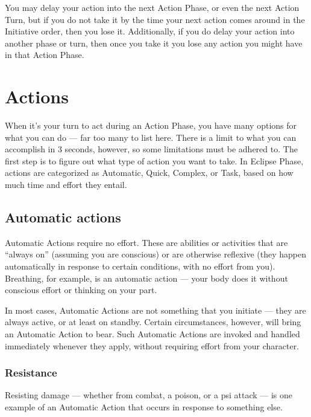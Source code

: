You may delay your action into the next Action Phase, or even the next Action Turn, but if you do not take it by the time your next action comes around in the Initiative order, then you lose it. Additionally, if you do delay your action into another phase or turn, then once you take it you lose any action you might have in that Action Phase. 



\section{Actions} \label{sec:actions} 

When it’s your turn to act during an Action Phase, you have many options for what you can do --- far too many to list here. There is a limit to what you can accomplish in 3 seconds, however, so some limitations must be adhered to. The first step is to figure out what type of action you want to take. In Eclipse Phase, actions are categorized as Automatic, Quick, Complex, or Task, based on how much time and effort they entail. 



\subsection{Automatic actions} \label{sec:combat-automatic-actions} 

Automatic Actions require no effort. These are abilities or activities that are ``always on'' (assuming you are conscious) or are otherwise reflexive (they happen automatically in response to certain conditions, with no effort from you). Breathing, for example, is an automatic action --- your body does it without conscious effort or thinking on your part. 

In most cases, Automatic Actions are not something that you initiate --- they are always active, or at least on standby. Certain circumstances, however, will bring an Automatic Action to bear. Such Automatic Actions are invoked and handled immediately whenever they apply, without requiring effort from your character. 

\subsubsection{Resistance} 

Resisting damage --- whether from combat, a poison, or a psi attack --- is one example of an Automatic Action that occurs in response to something else. 

